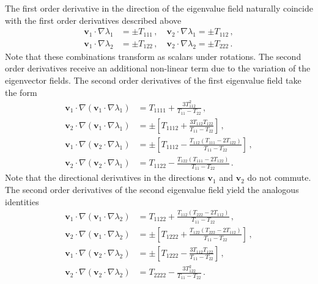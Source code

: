 \documentclass[a4paper, 11pt]{article}
\begin{document}
The first order derivative in the direction of the eigenvalue field naturally coincide with the first order derivatives described above
\begin{align}
\bm{v}_1 \cdot \nabla \lambda_1 &= \pm T_{111}\,,\quad
\bm{v}_2 \cdot \nabla \lambda_1 = \pm T_{112}\,,\\
\bm{v}_1 \cdot \nabla \lambda_2 &= \pm T_{122}\,,\quad
\bm{v}_2 \cdot \nabla \lambda_2 = \pm T_{222}\,.
\end{align}
Note that these combinations transform as scalars under rotations. The second order derivatives receive an additional non-linear term due to the variation of the eigenvector fields. The second order derivatives of the first eigenvalue field take the form
\begin{align}
\bm{v}_1 \cdot \nabla (\bm{v}_1 \cdot \nabla \lambda_1) &= T_{1111} + \frac{3T_{112}^2}{T_{11}-T_{22}}\,,\\
\bm{v}_2 \cdot \nabla (\bm{v}_1 \cdot \nabla \lambda_1) &= \pm \left[T_{1112} + \frac{3T_{112}T_{122}}{T_{11}-T_{22}}\right]\,,\\
\bm{v}_1 \cdot \nabla (\bm{v}_2 \cdot \nabla \lambda_1) &= \pm \left[T_{1112} - \frac{T_{112}(T_{111}-2T_{122})}{T_{11}-T_{22}}\right]\,,\\
\bm{v}_2 \cdot \nabla (\bm{v}_2 \cdot \nabla \lambda_1) &= T_{1122} - \frac{T_{122}(T_{111}-2T_{122})}{T_{11}-T_{22}}\,.
\end{align}
Note that the directional derivatives in the directions $\bm{v}_1$ and $\bm{v}_2$ do not commute. The second order derivatives of the second eigenvalue field yield the analogous identities
\begin{align}
\bm{v}_1 \cdot \nabla (\bm{v}_1 \cdot \nabla \lambda_2) &= T_{1122} + \frac{T_{112}(T_{222}-2T_{112})}{T_{11}-T_{22}}\,,\\
\bm{v}_2 \cdot \nabla (\bm{v}_1 \cdot \nabla \lambda_2) &= \pm\left[T_{1222} + \frac{T_{122}(T_{222}-2T_{112})}{T_{11}-T_{22}}\right]\,,\\
\bm{v}_1 \cdot \nabla (\bm{v}_2 \cdot \nabla \lambda_2) &= \pm\left[T_{1222} - \frac{3T_{112}T_{122}}{T_{11}-T_{22}}\right]\,,\\
\bm{v}_2 \cdot \nabla (\bm{v}_2 \cdot \nabla \lambda_2) &= T_{2222} - \frac{3T_{122}^2}{T_{11}-T_{22}}\,.
\end{align}

\end{document}
